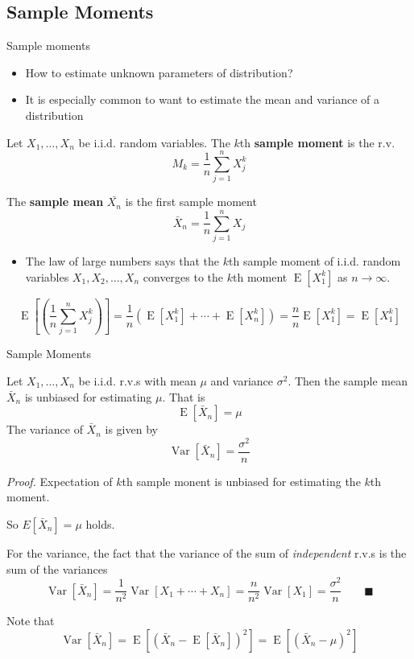 \documentclass[8pt]{beamer}
\newcommand{\tb}[1]{\textbf{#1}}
\newcommand{\ti}[1]{\textit{#1}}
\newcommand{\expec}[1]{\operatorname{E}\left[ #1 \right]}
\newcommand{\myvar}[1]{\operatorname{Var}\left[#1\right]}
\begin{document}
\subsection{Sample Moments}
\begin{frame}{Sample moments}
    \begin{itemize}
        \item How to estimate unknown parameters of distribution?
        \item It is especially common to want to estimate the mean and variance of a distribution
    \end{itemize}

    \begin{definition}
        Let $X_1, \dots, X_n$ be i.i.d. random variables.
        The $k$th \tb{sample moment} is the r.v.
        \[
        M_k = \frac{1}{n} \sum_{j=1}^n X_j^k
        \]
    \end{definition}

    The \tb{sample mean} $\bar{X_n}$ is the first sample moment
    \[
    \bar{X}_n = \frac{1}{n} \sum_{j=1}^n X_j
    \]

    \begin{itemize}
        \item The law of large numbers says that the $k$th sample moment of i.i.d. random variables $X_1, X_2, \dots, X_n$ converges to the $k$th moment $\expec{X_1^k}$ as $n \rightarrow \infty$.

    \end{itemize}
    \[
        \expec{\left(\frac{1}{n} \sum_{j=1}^n X_j^k\right)} = \frac{1}{n} \left(\expec{X_1^k} + \cdots + \expec{X^k_n} \right) = \frac{n}{n} \expec{X^k_1} = \expec{X^k_1}
   \]
\end{frame}

\begin{frame}{Sample Moments}
    \begin{theorem}
        Let $X_1, \dots, X_n$ be i.i.d. r.v.s with mean $\mu$ and variance $\sigma^2$. Then the sample mean $\bar{X}_n$ is unbiased for estimating $\mu$. That is
        \[
        \expec{\bar{X}_n} = \mu
        \]
        The variance of $\bar{X}_n$ is given by
        \[
        \myvar{\bar{X}_n} = \frac{\sigma^2}{n}
        \]
    \end{theorem}

    \ti{Proof.} Expectation of $k$th sample monent is unbiased for estimating the $k$th moment.

    So $E[\bar{X}_n] = \mu$ holds.

    For the variance, the fact that the variance of the sum of \ti{independent} r.v.s is the sum of the variances
    \[
    \myvar{\bar{X}_n} = \frac{1}{n^2} \myvar{X_1 + \cdots + X_n} = \frac{n}{n^2} \myvar{X_1} = \frac{\sigma^2}{n} \qquad \blacksquare
    \]

    Note that 
    \[
    \myvar{\bar{X}_n} = \expec{(\bar{X}_n - \expec{\bar{X}_n})^2} = \expec{(\bar{X}_n - \mu)^2}
    \]
\end{frame}
\end{document}
